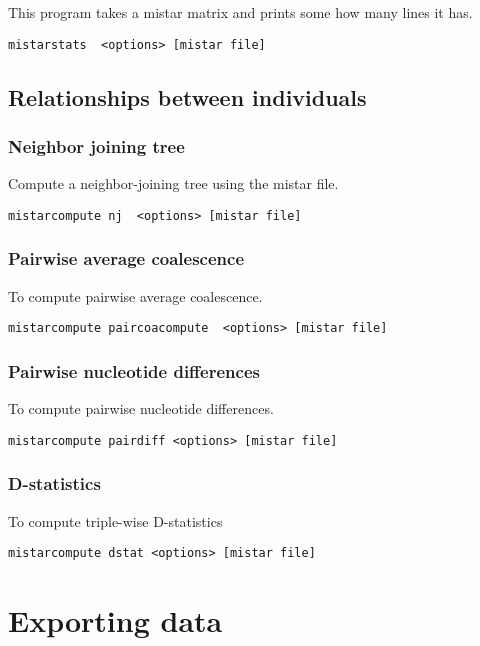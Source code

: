 \documentclass[a4paper]{article}
\begin{document}
\noindent This program takes a mistar matrix and prints some how many lines it has.
\begin{lstlisting}
mistarstats  <options> [mistar file]
\end{lstlisting}


\subsection{Relationships between individuals}


\subsubsection{Neighbor joining tree}

Compute a neighbor-joining tree using the mistar file.

\begin{lstlisting}
mistarcompute nj  <options> [mistar file]
\end{lstlisting}

\subsubsection{Pairwise average coalescence}

To compute pairwise average coalescence.
\begin{lstlisting}
mistarcompute paircoacompute  <options> [mistar file]
\end{lstlisting}

\subsubsection{Pairwise nucleotide differences}

To compute pairwise nucleotide differences.
\begin{lstlisting}
mistarcompute pairdiff <options> [mistar file]
\end{lstlisting}

\subsubsection{D-statistics}
To compute triple-wise D-statistics
\begin{lstlisting}
mistarcompute dstat <options> [mistar file]
\end{lstlisting}


\section{Exporting data}
\end{document}
